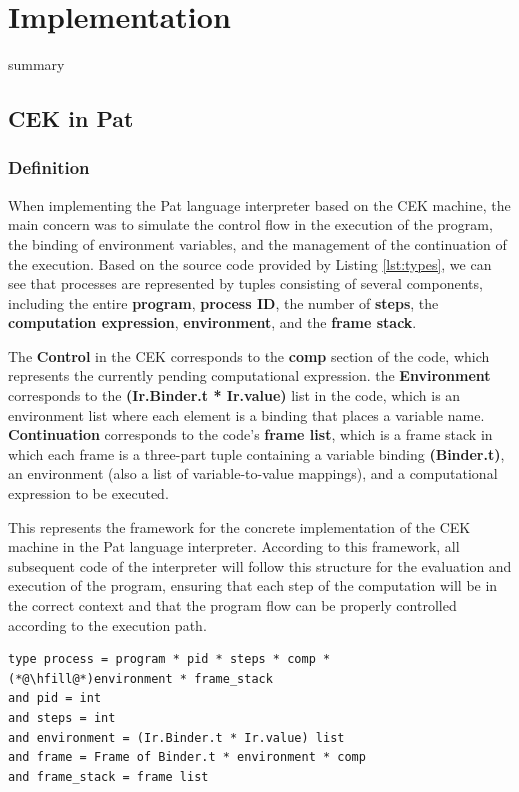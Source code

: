 \documentclass{l4proj}
\begin{document}
\chapter{Implementation}
summary
\section{CEK in Pat}
\subsection{Definition}
When implementing the Pat language interpreter based on the CEK machine, the main concern was to simulate the control flow in the execution of the program, the binding of environment variables, and the management of the continuation of the execution. Based on the source code provided by Listing \ref{lst:types}, we can see that processes are represented by tuples consisting of several components, including the entire \textbf{program}, \textbf{process ID}, the number of \textbf{steps}, the \textbf{computation expression}, \textbf{environment}, and the \textbf{frame stack}.

The \textbf{Control} in the CEK corresponds to the \textbf{comp} section of the code, which represents the currently pending computational expression. the \textbf{Environment} corresponds to the \textbf{(Ir.Binder.t * Ir.value)} list in the code, which is an environment list where each element is a binding that places a variable name. \textbf{Continuation} corresponds to the code's \textbf{frame list}, which is a frame stack in which each frame is a three-part tuple containing a variable binding \textbf{(Binder.t)}, an environment (also a list of variable-to-value mappings), and a computational expression to be executed. 

This represents the framework for the concrete implementation of the CEK machine in the Pat language interpreter. According to this framework, all subsequent code of the interpreter will follow this structure for the evaluation and execution of the program, ensuring that each step of the computation will be in the correct context and that the program flow can be properly controlled according to the execution path.

\noindent\begin{minipage}{\linewidth}
\lstset{style=Ocamlstyle}
\begin{lstlisting}[caption={Source Code of CEK Framework in Pat}, label={lst:types}]
type process = program * pid * steps * comp * 
(*@\hfill@*)environment * frame_stack 
and pid = int
and steps = int
and environment = (Ir.Binder.t * Ir.value) list
and frame = Frame of Binder.t * environment * comp
and frame_stack = frame list
\end{lstlisting}
\end{minipage}
\end{document}
